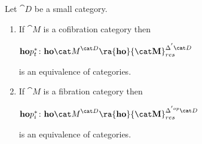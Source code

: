 \begin{thm}
\label{thm:pointwisecofstructureequivalence}
Let ${\cat D}$ be a small category.
\begin{enumerate}
\item
If ${\cat M}$ is a cofibration category then 
\begin{center}
${\bf ho}p_t^{*} \colon {\bf ho}{\cat M}^{\cat D} \ra {\bf ho}{\cat M}^{\Delta^{'}{\cat D}}_{res}$ 
\end{center}
is an equivalence of categories.
\item
If ${\cat M}$ is a fibration category then 
\begin{center}
${\bf ho}p_i^{*} \colon {\bf ho}{\cat M}^{\cat D} \ra {\bf ho}{\cat M}^{\Delta^{'op}{\cat D}}_{res}$ 
\end{center}
is an equivalence of categories.
\end{enumerate}
\end{thm}

